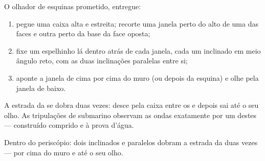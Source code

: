 \begin{method}\label{met:g5:mirrors-reflection:periscope}
O olhador de esquinas prometido, entregue:
\begin{enumerate}
  \item pegue uma caixa alta e estreita; recorte uma janela perto do
        alto de uma das faces e outra perto da base da face oposta;
  \item fixe um espelhinho lá dentro atrás de cada janela, cada um
        inclinado em meio ângulo reto, com as duas inclinações
        paralelas entre si;
  \item aponte a janela de cima por cima do muro (ou depois da
        esquina) e olhe pela janela de baixo.
\end{enumerate}
A estrada da  se dobra duas vezes: desce pela caixa entre os
 e depois sai até o seu olho. As tripulações de submarino
observam as ondas exatamente por um destes --- construído comprido e
à prova d'água.
\end{method}

\begin{omfigure}

{\small Dentro do periscópio: dois  inclinados e paralelos
dobram a estrada da  duas vezes --- por cima do muro e até o seu
olho.}
\end{omfigure}

